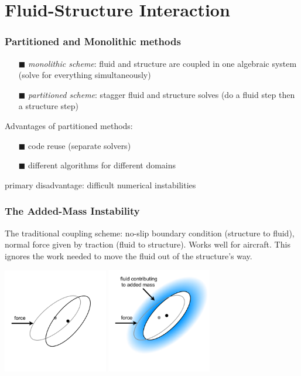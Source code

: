 \documentclass[8pt]{beamer}
\begin{document}
\section{Fluid-Structure Interaction}
\begin{frame}
    \frametitle{Partitioned and Monolithic methods}
    \begin{itemize}
        \item[$\blacksquare$] \emph{monolithic scheme}: fluid and structure are
        coupled in one algebraic system (solve for everything simultaneously)
        \item[$\blacksquare$] \emph{partitioned scheme}: stagger fluid and
        structure solves (do a fluid step then a structure step)
    \end{itemize}
    Advantages of partitioned methods:
    \begin{itemize}
        \item[$\blacksquare$] code reuse (separate solvers)
        \item[$\blacksquare$] different algorithms for different domains
    \end{itemize}
    primary disadvantage: difficult numerical instabilities
\end{frame}

\begin{frame}
    \frametitle{The Added-Mass Instability} The traditional coupling scheme:
    no-slip boundary condition (structure to fluid), normal force given by
    traction (fluid to structure). Works well for aircraft. This ignores the
    work needed to move the fluid out of the structure's way.

    \begin{center}
        \includegraphics[width=1.80in]{left.png}
        \hspace{0.5in}
        \includegraphics[width=1.80in]{right.png}
    \end{center}
\end{frame}
\end{document}
